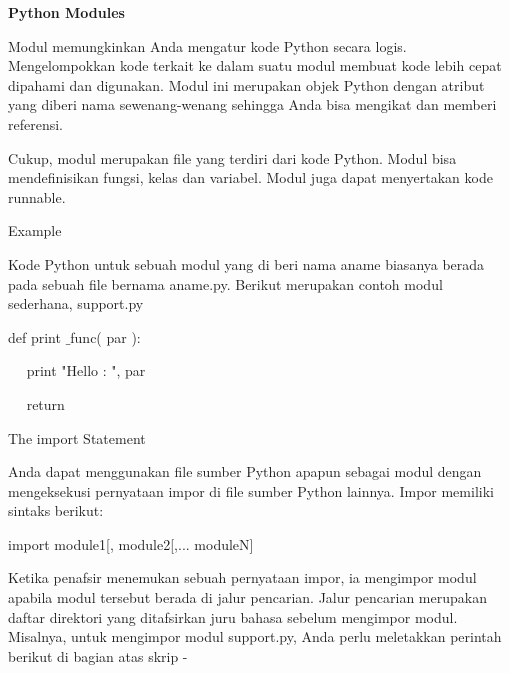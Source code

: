 
\sloppy
\begin{center}{\fontsize{16pt}{16pt}\selectfont \textbf{Python Modules} \\}\end{center} \par
\vspace{12pt}
\noindent 
Modul memungkinkan Anda mengatur kode Python secara logis. Mengelompokkan kode terkait ke dalam suatu modul membuat kode lebih cepat dipahami dan digunakan. Modul ini merupakan objek Python dengan atribut yang diberi nama sewenang-wenang sehingga Anda bisa mengikat dan memberi referensi. \par
\noindent 
Cukup, modul merupakan file yang terdiri dari kode Python. Modul bisa mendefinisikan fungsi, kelas dan variabel. Modul juga dapat menyertakan kode runnable. \par
\vspace{12pt}
\noindent 
Example \par
\noindent 
Kode Python untuk sebuah modul yang di beri nama aname biasanya berada pada sebuah file bernama aname.py. Berikut merupakan contoh modul sederhana, support.py \par
\noindent 
 \hspace*{0.5in} def print $  \_  $func( par ): \par
\noindent 
 \hspace*{0.5in} ~~ print "Hello : ", par \par
\noindent 
 \hspace*{0.5in} ~~ return \par
\vspace{12pt}
\noindent 
The $  $import $  $Statement \par
\noindent 
Anda dapat menggunakan file sumber Python apapun sebagai modul dengan mengeksekusi pernyataan impor di file sumber Python lainnya. Impor memiliki sintaks berikut: \par
\noindent 
 \hspace*{0.5in} import module1[, module2[,... moduleN] \par
\noindent 
Ketika penafsir menemukan sebuah pernyataan impor, ia mengimpor modul apabila modul tersebut berada di jalur pencarian. Jalur pencarian merupakan daftar direktori yang ditafsirkan juru bahasa sebelum mengimpor modul. Misalnya, untuk mengimpor modul support.py, Anda perlu meletakkan perintah berikut di bagian atas skrip - \par
